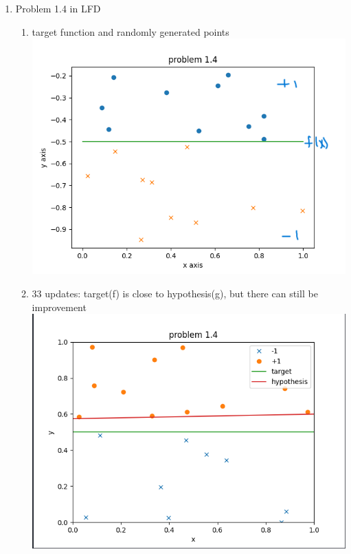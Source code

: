 \documentclass{article}
\begin{document}
\begin{enumerate}
        \item Problem 1.4 in LFD
        \begin{enumerate}
            \item target function and randomly generated points \\\includegraphics[scale=0.5]{images/a.png}
            \item 33 updates: target(f) is close to hypothesis(g), but there can still be improvement \\\includegraphics[scale=0.5]{images/b.png}

\end{enumerate}
\end{enumerate}
\end{document}
